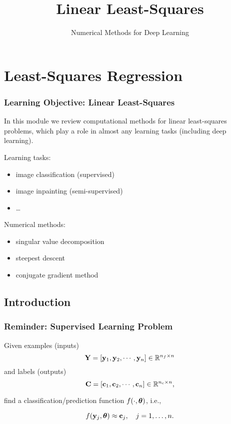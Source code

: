 \documentclass[12pt,fleqn,handout]{beamer}
\title{Linear Least-Squares}
\subtitle{Numerical Methods for Deep Learning}
\date{}
\begin{document}
\makebeamertitle



\section{Least-Squares Regression} 
\label{sec:least_squares_regression}

\begin{frame}
	\frametitle{Learning Objective: Linear Least-Squares}
	
	In this module we review computational methods for linear least-squares problems, which play a role in almost any learning tasks (including deep learning).
	
	\bigskip
	
	Learning tasks:
	\begin{itemize}
		\item image classification (supervised)
		\item image inpainting (semi-supervised) 
		\item \ldots
	\end{itemize}
	
	\bigskip
	
	Numerical methods:
	\begin{itemize}
		\item singular value decomposition
		\item steepest descent
		\item conjugate gradient method
	\end{itemize}
\end{frame}

\subsection{Introduction} %
\label{sub:introduction}

\begin{frame}\frametitle{Reminder: Supervised Learning Problem}

Given examples (inputs)
$$ {\bf Y} = \left[{\bf y}_1,  {\bf y}_2 , \cdots, {\bf y}_n \right] \in\mathbb{R}^{n_f\times n}$$
and labels (outputs)
$$ {\bf C} = \left[ {\bf c}_1,  {\bf c}_2, \cdots,  {\bf c}_n \right] \in\mathbb{R}^{n_c\times n},$$

find a classification/prediction function $f(\cdot,{\boldsymbol \theta})$, i.e., 

$$
f({\bf y}_j,{\boldsymbol \theta}) \approx {\bf c}_j, \quad j=1,\ldots,n.
$$

\end{frame}
\end{document}

